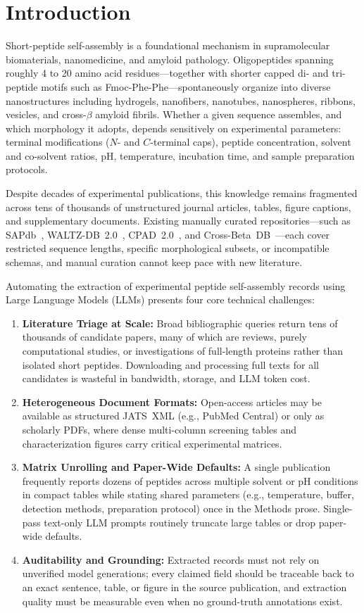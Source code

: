 \section{Introduction}
\label{sec:introduction}

Short-peptide self-assembly is a foundational mechanism in supramolecular biomaterials, nanomedicine, and amyloid pathology. Oligopeptides spanning roughly 4 to 20 amino acid residues---together with shorter capped di- and tri-peptide motifs such as Fmoc-Phe-Phe---spontaneously organize into diverse nanostructures including hydrogels, nanofibers, nanotubes, nanospheres, ribbons, vesicles, and cross-$\beta$ amyloid fibrils. Whether a given sequence assembles, and which morphology it adopts, depends sensitively on experimental parameters: terminal modifications ($N$- and $C$-terminal caps), peptide concentration, solvent and co-solvent ratios, pH, temperature, incubation time, and sample preparation protocols.

Despite decades of experimental publications, this knowledge remains fragmented across tens of thousands of unstructured journal articles, tables, figure captions, and supplementary documents. Existing manually curated repositories---such as SAPdb~\cite{sapdb2020}, WALTZ-DB~2.0~\cite{waltzdb2020}, CPAD~2.0~\cite{cpad2020}, and Cross-Beta~DB~\cite{crossbetadb2024}---each cover restricted sequence lengths, specific morphological subsets, or incompatible schemas, and manual curation cannot keep pace with new literature.

Automating the extraction of experimental peptide self-assembly records using Large Language Models (LLMs) presents four core technical challenges:
\begin{enumerate}
    \item \textbf{Literature Triage at Scale:} Broad bibliographic queries return tens of thousands of candidate papers, many of which are reviews, purely computational studies, or investigations of full-length proteins rather than isolated short peptides. Downloading and processing full texts for all candidates is wasteful in bandwidth, storage, and LLM token cost.
    \item \textbf{Heterogeneous Document Formats:} Open-access articles may be available as structured JATS~XML (e.g., PubMed Central) or only as scholarly PDFs, where dense multi-column screening tables and characterization figures carry critical experimental matrices.
    \item \textbf{Matrix Unrolling and Paper-Wide Defaults:} A single publication frequently reports dozens of peptides across multiple solvent or pH conditions in compact tables while stating shared parameters (e.g., temperature, buffer, detection methods, preparation protocol) once in the Methods prose. Single-pass text-only LLM prompts routinely truncate large tables or drop paper-wide defaults.
    \item \textbf{Auditability and Grounding:} Extracted records must not rely on unverified model generations; every claimed field should be traceable back to an exact sentence, table, or figure in the source publication, and extraction quality must be measurable even when no ground-truth annotations exist.
\end{enumerate}

